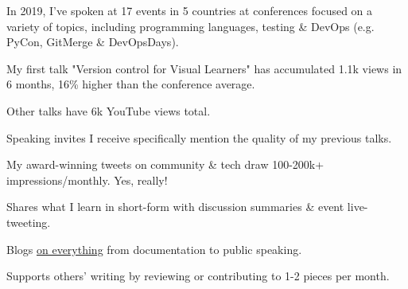 \documentclass[letterpaper]{deedy-resume} %
\begin{document}
\begin{minipage}[t]{0.66\textwidth}

\vspace{\topsep} %
\begin{tightitemize}
\item In 2019, I've spoken at 17 events in 5 countries at conferences focused on a variety of topics, including programming languages, testing \& DevOps (e.g. PyCon, GitMerge \& DevOpsDays).
\item My first talk "Version control for Visual Learners" has accumulated 1.1k views in 6 months, 16\% higher than the conference average.
\item Other talks have 6k YouTube views total.
\item Speaking invites I receive specifically mention the quality of my previous talks.
\end{tightitemize}

\sectionspace %


\begin{tightitemize}
\item My award-winning tweets on community \& tech draw 100-200k+ impressions/monthly. Yes, really!
\item Shares what I learn in short-form with discussion summaries \& event live-tweeting.
\end{tightitemize}

\sectionspace %


\begin{tightitemize}
\item Blogs \href{}{on everything} from documentation to public speaking.
\item Supports others' writing by reviewing or contributing to 1-2 pieces per month.
\end{tightitemize}


\end{minipage}
\end{document}

